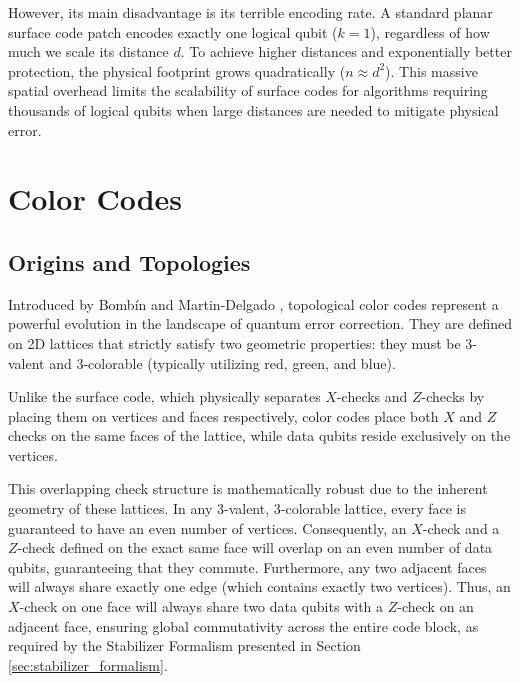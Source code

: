 However, its main disadvantage is its terrible encoding rate. A standard planar surface code patch encodes exactly one logical qubit ($k=1$), regardless of how much we scale its distance $d$. To achieve higher distances and exponentially better protection, the physical footprint grows quadratically ($n \approx d^2$). This massive spatial overhead limits the scalability of surface codes for algorithms requiring thousands of logical qubits when large distances are needed to mitigate physical error.

\section{Color Codes}

\subsection{Origins and Topologies}
Introduced by Bombín and Martin-Delgado \cite{bombin_martindelgado_2006}, topological color codes represent a powerful evolution in the landscape of quantum error correction. They are defined on 2D lattices that strictly satisfy two geometric properties: they must be 3-valent and 3-colorable (typically utilizing red, green, and blue).

Unlike the surface code, which physically separates $X$-checks and $Z$-checks by placing them on vertices and faces respectively, color codes place both $X$ and $Z$ checks on the same faces of the lattice, while data qubits reside exclusively on the vertices. 

This overlapping check structure is mathematically robust due to the inherent geometry of these lattices. In any 3-valent, 3-colorable lattice, every face is guaranteed to have an even number of vertices. Consequently, an $X$-check and a $Z$-check defined on the exact same face will overlap on an even number of data qubits, guaranteeing that they commute. Furthermore, any two adjacent faces will always share exactly one edge (which contains exactly two vertices). Thus, an $X$-check on one face will always share two data qubits with a $Z$-check on an adjacent face, ensuring global commutativity across the entire code block, as required by the Stabilizer Formalism presented in Section \ref{sec:stabilizer_formalism}.

